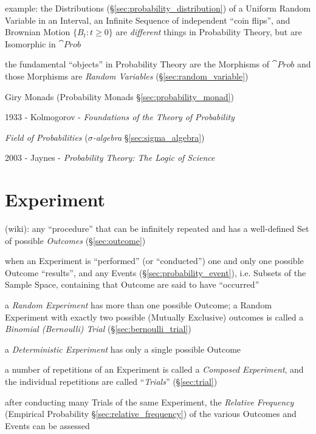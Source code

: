 example: the Distributions (\S\ref{sec:probability_distribution}) of a Uniform
Random Variable in an Interval, an Infinite Sequence of independent ``coin
flips'', and Brownian Motion $\{B_t : t \geq 0\}$ are \emph{different} things in
Probability Theory, but are Isomorphic in $\cat{Prob}$

the fundamental ``objects'' in Probability Theory are the Morphisms of
$\cat{Prob}$ and those Morphisms are \emph{Random Variables}
(\S\ref{sec:random_variable})

\fist Giry Monads (Probability Monads \S\ref{sec:probability_monad})

\asterism

1933 - Kolmogorov - \emph{Foundations of the Theory of Probability}

\emph{Field of Probabilities} (\emph{$\sigma$-algebra}
\S\ref{sec:sigma_algebra})

\asterism

2003 - Jaynes - \emph{Probability Theory: The Logic of Science}



\section{Experiment}\label{sec:experiment}

(wiki): any ``procedure'' that can be infinitely repeated and has a well-defined
Set of possible \emph{Outcomes} (\S\ref{sec:outcome})

when an Experiment is ``performed'' (or ``conducted'') one and only one possible
Outcome ``results'', and any Events (\S\ref{sec:probability_event}), i.e.
Subsets of the Sample Space, containing that Outcome are said to have
``occurred''

a \emph{Random Experiment} has more than one possible Outcome; a Random
Experiment with exactly two possible (Mutually Exclusive) outcomes is called a
\emph{Binomial (Bernoulli) Trial} (\S\ref{sec:bernoulli_trial})

a \emph{Deterministic Experiment} has only a single possible Outcome

a number of repetitions of an Experiment is called a \emph{Composed Experiment},
and the individual repetitions are called ``\emph{Trials}'' (\S\ref{sec:trial})

after conducting many Trials of the same Experiment, the \emph{Relative
  Frequency} (Empirical Probability \S\ref{sec:relative_frequency}) of the
various Outcomes and Events can be assessed

